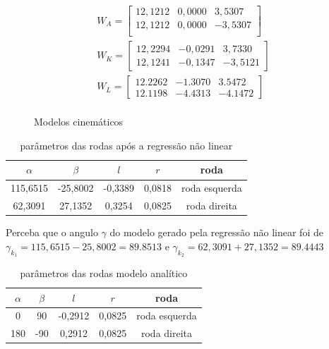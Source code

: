 \begin{figure}[H]
    \label{fig:parametros:da:cinemantica}
    \begin{align*}
        W_{A} = 
        \begin{bmatrix}
            12,1212 &  0,0000 & 3,5307 \\
            12,1212 &  0,0000 & -3,5307 \\
        \end{bmatrix}\\
        W_{K} = 
        \begin{bmatrix}
            12,2294 &  -0,0291 & 3,7330 \\
            12,1241 &  -0,1347 & -3,5121
        \end{bmatrix}\\
        W_{L} = 
        \begin{bmatrix}
            12.2262 &  -1.3070 & 3.5472 \\
            12.1198 &  -4.4313 & -4.1472
        \end{bmatrix}\\
    \end{align*}
    \caption{Modelos cinemáticos}
\end{figure}

\begin{table}[H]
    \label{table:param:kinematic}
    \centering
    \begin{tabular}{c|c|c|c|c}
        \hline
         $\alpha$ &$\beta$ &$l$ &$r$ & roda \\
        \hline
        115,6515 &-25,8002 &-0,3389 &0,0818 & roda esquerda \\
        \hline
        62,3091  &27,1352 &0,3254 &0,0825 & roda direita \\
        \hline
    \end{tabular}
    \caption{parâmetros das rodas após a regressão não linear}
\end{table}
Perceba que o angulo $\gamma$ do modelo gerado pela regressão não
linear foi de $\gamma_{k_1} = 115,6515 -25,8002  = 89.8513$ e 
$\gamma_{k_2} = 62,3091 +27,1352 = 89.4443$
\begin{table}[H]
    \label{table:param:analytic}
    \centering
    \begin{tabular}{c|c|c|c|c}
        \hline
         $\alpha$ &$\beta$ &$l$ &$r$ & roda \\
        \hline
        0 & 90 &-0,2912 &0,0825 & roda esquerda \\
        \hline
        180  &-90 & 0,2912 &0,0825 & roda direita \\
        \hline
    \end{tabular}
    \caption{parâmetros das rodas modelo analítico}
\end{table}



